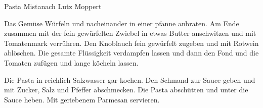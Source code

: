 \begin{recipe}{Pasta Mista}{nach Lutz Moppert}
  \inglist

  \steps
  Das Gemüse Würfeln und nacheinander in einer pfanne anbraten. Am Ende zusammen mit der
  fein gewürfelten Zwiebel in etwas Butter anschwitzen und mit Tomatenmark verrühren.
  Den Knoblauch fein gewürfelt zugeben und mit Rotwein ablöschen. Die gesamte Flüssigkeit
  verdampfen lassen und dann den Fond und die Tomaten zufügen und lange köcheln lassen.

  Die Pasta in reichlich Salzwasser gar kochen. Den Schmand zur Sauce geben und mit
  Zucker, Salz und Pfeffer abschmecken. Die Pasta abschütten und unter die Sauce heben.
  Mit geriebenem Parmesan servieren.
\end{recipe}
